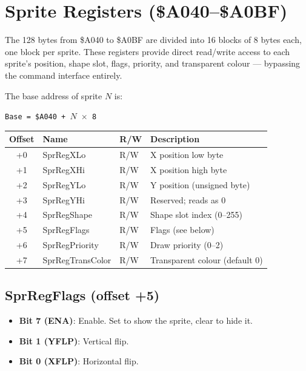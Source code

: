 \section{Sprite Registers (\$A040--\$A0BF)}
\label{sec:vgc-sprite-regs}

The 128 bytes from \$A040 to \$A0BF are divided into 16 blocks of 8 bytes
each, one block per sprite.  These registers provide direct read/write access
to each sprite's position, shape slot, flags, priority, and transparent
colour --- bypassing the command interface entirely.

The base address of sprite $N$ is:

\begin{center}
\texttt{Base = \$A040 + $N$ $\times$ 8}
\end{center}

\begin{center}
\small
\begin{tabular}{@{}clll@{}}
\toprule
\textbf{Offset} & \textbf{Name} & \textbf{R/W} & \textbf{Description} \\
\midrule
+0 & SprRegXLo       & R/W & X position low byte \\
+1 & SprRegXHi       & R/W & X position high byte \\
+2 & SprRegYLo       & R/W & Y position (unsigned byte) \\
+3 & SprRegYHi       & R/W & Reserved; reads as 0 \\
+4 & SprRegShape     & R/W & Shape slot index (0--255) \\
+5 & SprRegFlags     & R/W & Flags (see below) \\
+6 & SprRegPriority  & R/W & Draw priority (0--2) \\
+7 & SprRegTransColor & R/W & Transparent colour (default 0) \\
\bottomrule
\end{tabular}
\end{center}

\subsection*{SprRegFlags (offset +5)}


\begin{itemize}
  \item \textbf{Bit 7 (ENA)}: Enable.  Set to show the sprite, clear to hide it.
  \item \textbf{Bit 1 (YFLP)}: Vertical flip.
  \item \textbf{Bit 0 (XFLP)}: Horizontal flip.
\end{itemize}

